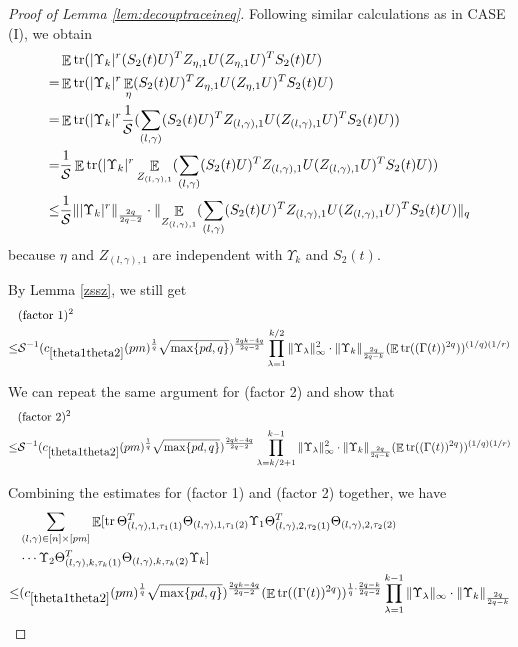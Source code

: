 \documentclass[11pt]{amsart}
\numberwithin{equation}{section}
\numberwithin{equation}{section}
\DeclareMathOperator{\E}{\mathbb{E}}
\DeclareMathOperator*{\tr}{tr}
\newcommand{\cS}{\mathcal{S}}
\DeclarePairedDelimiter{\norm}{\lVert}{\rVert}
\theoremstyle{remark}
\theoremstyle{definition}
\begin{document}
\begin{proof}[Proof of Lemma \ref{lem:decouptraceineq}]
Following similar calculations as in CASE (I), we obtain
\begin{align*}
    &\E\tr( |\Upsilon_k|^{r}  (S_2(t)U)^T Z_{\eta,1}U (Z_{\eta,1}U)^TS_2(t)U )
    \\=&\E\tr( |\Upsilon_k|^{r}  \E_{\eta}(S_2(t)U)^T Z_{\eta,1}U (Z_{\eta,1}U)^TS_2(t)U )
    \\=&\E\tr( |\Upsilon_k|^{r}  \frac{1}{\cS}(\sum\limits_{(l,\gamma)}(S_2(t)U)^T Z_{(l,\gamma),1}U (Z_{(l,\gamma),1}U)^TS_2(t)U ))
    \\=&\frac{1}{\cS}\E\tr( |\Upsilon_k|^{r}  \E_{Z_{(l,\gamma),1}}(\sum\limits_{(l,\gamma)}(S_2(t)U)^T Z_{(l,\gamma),1}U (Z_{(l,\gamma),1}U)^TS_2(t)U ))
    \\ \le& \frac{1}{\cS} \norm{|\Upsilon_k|^{r}}_{\frac{2q}{2q-2}} \cdot \norm{\E_{Z_{(l,\gamma),1}}(\sum_{(l,\gamma)}(S_2(t)U)^T Z_{(l,\gamma),1}U (Z_{(l,\gamma),1}U)^TS_2(t)U)}_{q}
\end{align*}
because $\eta$ and $Z_{(l,\gamma),1}$ are independent with $\Upsilon_k$ and $S_2(t)$.

By Lemma \ref{zssz}, we still get
\begin{align*}
    &(\text{factor 1})^2
  \\ \le &\cS^{-1}(c_{\ref*{theta1theta2}}(pm)^{\frac{1}{q}} \sqrt{\max\{pd,q\}})^{\frac{2qk-4q}{2q-2}}\prod\limits_{\lambda  = 1}^{k/2} {\norm{\Upsilon_\lambda }_{\infty}^2} \cdot \norm{\Upsilon_k}_{\frac{2q}{2q-k}}(\E \tr((\Gamma(t))^{2q}))^{(1/q)(1/r)}
\end{align*}

We can repeat the same argument for (factor 2) and show that
\begin{align*}
    &(\text{factor 2})^2
  \\ \le &\cS^{-1}(c_{\ref*{theta1theta2}} (pm)^{\frac{1}{q}}\sqrt{\max\{pd,q\}})^{\frac{2qk-4q}{2q-2}}\prod\limits_{\lambda  = k/2+1}^{k-1} {\norm{\Upsilon_\lambda }_{\infty}^2} \cdot \norm{\Upsilon_k}_{\frac{2q}{2q-k}}(\E \tr((\Gamma(t))^{2q}))^{(1/q)(1/r)}
\end{align*}

Combining the estimates for (factor 1) and (factor 2) together, we have
\begin{align*}
    &\sum_{(l,\gamma) \in [n] \times [pm]} \E[ \tr \Theta_{(l,\gamma), 1, \tau_1(1)}^T\Theta_{(l,\gamma), 1, \tau_1(2)}
	\Upsilon_1\Theta_{(l,\gamma), 2, \tau_2(1)}^T\Theta_{(l,\gamma), 2, \tau_2(2)} \\&\cdots
	\Upsilon_2\Theta_{(l,\gamma), k, \tau_k(1)}^T\Theta_{(l,\gamma), k, \tau_k(2)}\Upsilon_k]  \\ \le &
      (c_{\ref*{theta1theta2}}(pm)^{\frac{1}{q}}\sqrt{\max\{pd,q\}})^{\frac{2qk-4q}{2q-2}} (\E \tr((\Gamma(t))^{2q}))^{\frac{1}{q} \cdot \frac{2q-k}{2q-2}} \prod\limits_{\lambda  = 1}^{k-1} {\norm{\Upsilon_\lambda }_{\infty}} \cdot \norm{\Upsilon_k}_{\frac{2q}{2q-k}}
\end{align*}


\end{proof}
\end{document}
